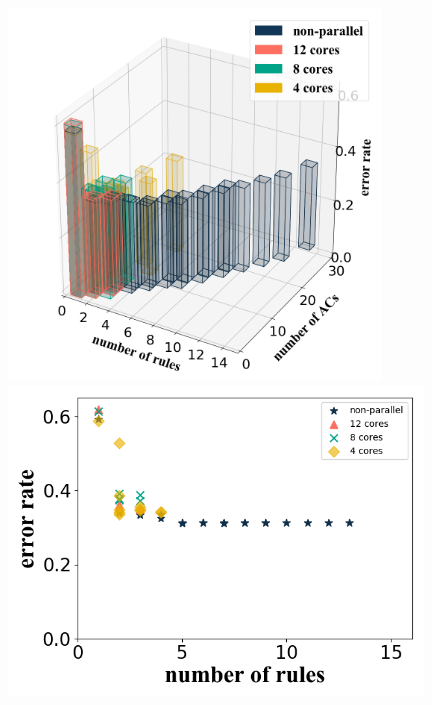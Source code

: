 \documentclass[conference]{IEEEtran}
\begin{document}
  \begin{figure}[H]
    \centering
    \begin{minipage}[t]{0.40\textwidth}
    \includegraphics[width=0.88\textwidth]{figures/diffCoreTest1.png}
    \end{minipage}
    \centering
    \begin{minipage}[t]{0.25\textwidth}
    \includegraphics[width=0.98\textwidth]{figures/diffCoreTest2.png}
    \end{minipage}%
    \centering

\end{figure}
\end{document}
